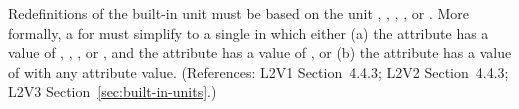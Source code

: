 Redefinitions of the built-in unit  must be based on the
unit , , , , or
.  More formally, a \UnitDefinition for
 must simplify to a single \Unit in which either
(a) the  attribute has a value of ,
, , or , and the 
attribute has a value of , or (b) the  attribute has a
value of  with any  attribute value.
(References: L2V1 Section~4.4.3; L2V2 Section~4.4.3; L2V3
Section~\ref{sec:built-in-units}.)
